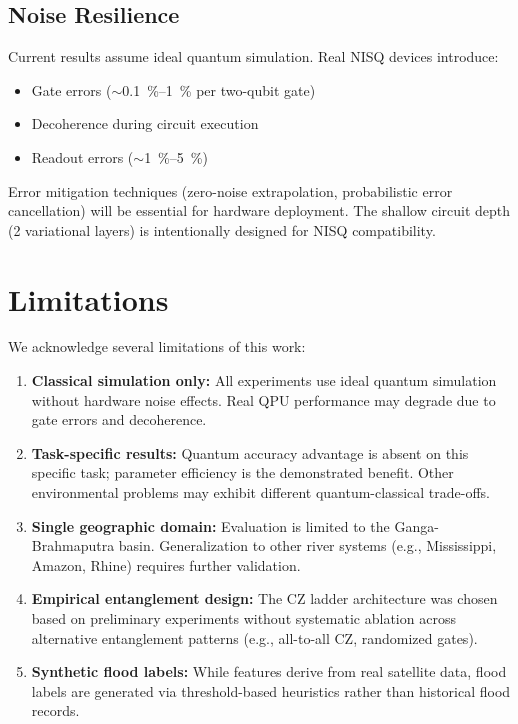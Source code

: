 \documentclass[conference]{IEEEtran}
\begin{document}
\subsection{Noise Resilience}

Current results assume ideal quantum simulation. Real NISQ devices introduce:
\begin{itemize}
\item Gate errors ($\sim$\SI{0.1}{\percent}--\SI{1}{\percent} per two-qubit gate)
\item Decoherence during circuit execution
\item Readout errors ($\sim$\SI{1}{\percent}--\SI{5}{\percent})
\end{itemize}

Error mitigation techniques (zero-noise extrapolation, probabilistic error cancellation) will be essential for hardware deployment. The shallow circuit depth (2 variational layers) is intentionally designed for NISQ compatibility.

\section{Limitations}
\label{sec:limitations}

We acknowledge several limitations of this work:

\begin{enumerate}
\item \textbf{Classical simulation only:} All experiments use ideal quantum simulation without hardware noise effects. Real QPU performance may degrade due to gate errors and decoherence.

\item \textbf{Task-specific results:} Quantum accuracy advantage is absent on this specific task; parameter efficiency is the demonstrated benefit. Other environmental problems may exhibit different quantum-classical trade-offs.

\item \textbf{Single geographic domain:} Evaluation is limited to the Ganga-Brahmaputra basin. Generalization to other river systems (e.g., Mississippi, Amazon, Rhine) requires further validation.

\item \textbf{Empirical entanglement design:} The CZ ladder architecture was chosen based on preliminary experiments without systematic ablation across alternative entanglement patterns (e.g., all-to-all CZ, randomized gates).

\item \textbf{Synthetic flood labels:} While features derive from real satellite data, flood labels are generated via threshold-based heuristics rather than historical flood records.
\end{enumerate}
\end{document}
